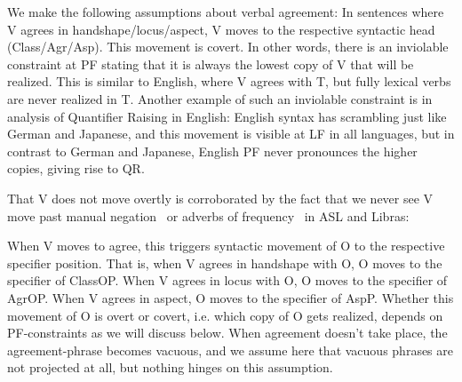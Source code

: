 \documentclass[output=paper,colorlinks,citecolor=brown,
]{langscibook}
\begin{document}
We make the following assumptions about verbal agreement:
In sentences where V agrees in handshape/locus/aspect, V
moves to the respective syntactic head (Class/Agr/Asp). This movement
is covert. In other words, there is an inviolable constraint at PF stating
that it is always the lowest copy of V that will be realized. This is
similar to English, where V agrees with T, but fully lexical verbs are
never realized in T. Another example of such an inviolable constraint
is in  analysis of Quantifier Raising in
English: English syntax has scrambling just like German and
Japanese, and this movement is visible at LF in all languages, but in
contrast to German and Japanese, English PF never pronounces the
higher copies, giving rise to QR.

That V does not move overtly is corroborated by the fact that
we never see V move past manual negation~ or adverbs of
frequency~ in ASL and Libras:

\ea
    \label{lasz:ex:8}
    \z 
\ex 
    \label{lasz:ex:9}
    \z
\z 

\noindent 
When V moves to agree, this triggers syntactic movement of O to the
respective specifier position. That is, when V agrees in handshape
with O, O moves to the specifier of ClassOP. When V agrees in
locus with O, O moves to the specifier of AgrOP. When V agrees in
aspect, O moves to the specifier of AspP. Whether this movement of O
is overt or covert, i.e. which copy of O gets realized, depends on
PF-constraints as we will discuss below. When agreement doesn’t take
place, the agreement-phrase becomes vacuous, and we assume here
that vacuous phrases are not projected at all, but nothing hinges on this
assumption.
\end{document}
